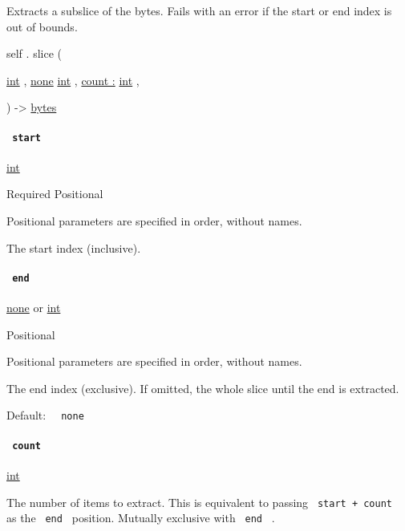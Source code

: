 Extracts a subslice of the bytes. Fails with an error if the start or
end index is out of bounds.

self { . } { slice } (

{ \href{/docs/reference/foundations/int/}{int} , } {
\href{/docs/reference/foundations/none/}{none}
\href{/docs/reference/foundations/int/}{int} , } {
\hyperref[definitions-slice-parameters-count]{count :}
\href{/docs/reference/foundations/int/}{int} , }

) -\textgreater{} \href{/docs/reference/foundations/bytes/}{bytes}

\paragraph{\texorpdfstring{\texttt{\ start\ }}{ start }}\label{definitions-slice-start}

\href{/docs/reference/foundations/int/}{int}

{Required} {{ Positional }}

\label{definitions-slice-start-positional-tooltip}
Positional parameters are specified in order, without names.

The start index (inclusive).

\paragraph{\texorpdfstring{\texttt{\ end\ }}{ end }}\label{definitions-slice-end}

\href{/docs/reference/foundations/none/}{none} {or}
\href{/docs/reference/foundations/int/}{int}

{{ Positional }}

\label{definitions-slice-end-positional-tooltip}
Positional parameters are specified in order, without names.

The end index (exclusive). If omitted, the whole slice until the end is
extracted.

Default: \texttt{\ }{\texttt{\ none\ }}\texttt{\ }

\paragraph{\texorpdfstring{\texttt{\ count\ }}{ count }}\label{definitions-slice-count}

\href{/docs/reference/foundations/int/}{int}

The number of items to extract. This is equivalent to passing
\texttt{\ start\ +\ count\ } as the \texttt{\ end\ } position. Mutually
exclusive with \texttt{\ end\ } .

